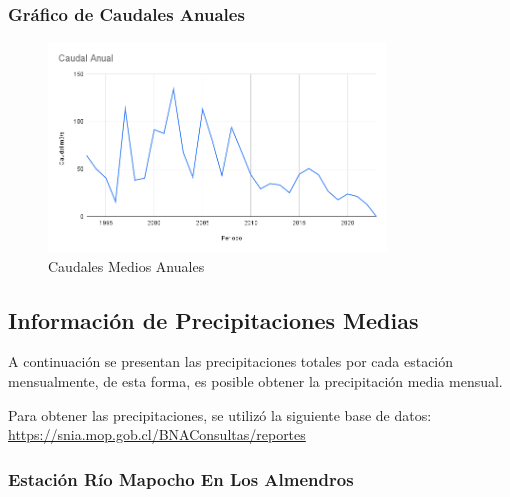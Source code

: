 \documentclass{article} %
\begin{document}
\newpage
\subsubsection{Gráfico de Caudales Anuales}
\begin{figure}[h!]
    \centering
    \includegraphics[width=0.8\textwidth]{GRAFICOS/Caudal Anual.png}
    \caption{Caudales Medios Anuales}
    \label{fig:caudales_anual}
\end{figure}

\newpage
\subsection{Información de Precipitaciones Medias}
A continuación se presentan las precipitaciones totales por cada estación mensualmente, de esta forma, es posible obtener la precipitación media mensual. 

Para obtener las precipitaciones, se utilizó la siguiente base de datos: \url{https://snia.mop.gob.cl/BNAConsultas/reportes}

\subsubsection{Estación Río Mapocho En Los Almendros}
\end{document}
